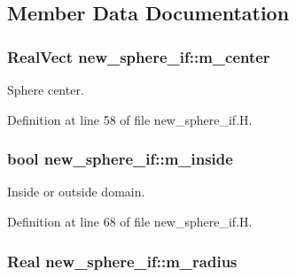 \subsection{Member Data Documentation}
\subsubsection[{\texorpdfstring{m\+\_\+center}{m_center}}]{\setlength{\rightskip}{0pt plus 5cm}Real\+Vect new\+\_\+sphere\+\_\+if\+::m\+\_\+center\hspace{0.3cm}{\ttfamily [protected]}}\hypertarget{classnew__sphere__if_a6bdebc35e9252d52da594c02b1875f17}{}\label{classnew__sphere__if_a6bdebc35e9252d52da594c02b1875f17}


Sphere center. 



Definition at line 58 of file new\+\_\+sphere\+\_\+if.\+H.

\subsubsection[{\texorpdfstring{m\+\_\+inside}{m_inside}}]{\setlength{\rightskip}{0pt plus 5cm}bool new\+\_\+sphere\+\_\+if\+::m\+\_\+inside\hspace{0.3cm}{\ttfamily [protected]}}\hypertarget{classnew__sphere__if_a8fda3a2d9eeab6b57502b556ebadeedf}{}\label{classnew__sphere__if_a8fda3a2d9eeab6b57502b556ebadeedf}


Inside or outside domain. 



Definition at line 68 of file new\+\_\+sphere\+\_\+if.\+H.

\subsubsection[{\texorpdfstring{m\+\_\+radius}{m_radius}}]{\setlength{\rightskip}{0pt plus 5cm}Real new\+\_\+sphere\+\_\+if\+::m\+\_\+radius\hspace{0.3cm}{\ttfamily [protected]}}\hypertarget{classnew__sphere__if_a4d1f9bbbb04df3f8e6be89909e32fd0a}{}\label{classnew__sphere__if_a4d1f9bbbb04df3f8e6be89909e32fd0a}


